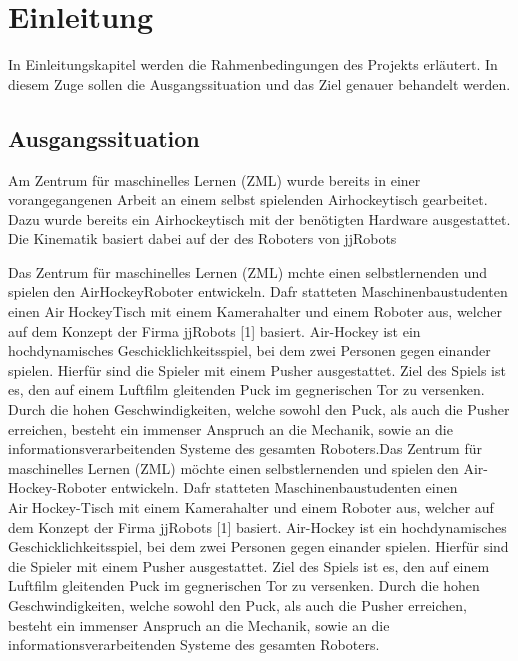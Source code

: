 \chapter{Einleitung}
\label{ch:Einleitung}

In Einleitungskapitel werden die Rahmenbedingungen des Projekts erläutert.
In diesem Zuge sollen die Ausgangssituation und das Ziel genauer behandelt werden.
\section{Ausgangssituation}
\label{sect:Ausgangssituation}

Am Zentrum für maschinelles Lernen (ZML) wurde bereits in einer vorangegangenen Arbeit an einem selbst spielenden Airhockeytisch gearbeitet. Dazu wurde bereits ein Airhockeytisch mit der benötigten Hardware ausgestattet. Die Kinematik basiert dabei auf der des Roboters von jjRobots \cite{jjrob}

Das Zentrum für maschinelles Lernen (ZML) mchte einen selbstlernenden und spielenden AirHockeyRoboter entwickeln. Dafr statteten Maschinenbaustudenten einen AirHockeyTisch mit einem Kamerahalter und einem Roboter aus, welcher auf dem Konzept
der Firma jjRobots [1] basiert.
Air-Hockey ist ein hochdynamisches Geschicklichkeitsspiel, bei dem zwei Personen gegeneinander spielen. Hierfür sind die Spieler mit einem Pusher ausgestattet. Ziel des Spiels
ist es, den auf einem Luftfilm gleitenden Puck im gegnerischen Tor zu versenken. Durch
die hohen Geschwindigkeiten, welche sowohl den Puck, als auch die Pusher erreichen, besteht ein immenser Anspruch an die Mechanik, sowie an die informationsverarbeitenden
Systeme des gesamten Roboters.Das Zentrum für maschinelles Lernen (ZML) möchte einen selbstlernenden und spielenden Air-Hockey-Roboter entwickeln. Dafr statteten Maschinenbaustudenten einen AirHockey-Tisch mit einem Kamerahalter und einem Roboter aus, welcher auf dem Konzept
der Firma jjRobots [1] basiert.
Air-Hockey ist ein hochdynamisches Geschicklichkeitsspiel, bei dem zwei Personen gegeneinander spielen. Hierfür sind die Spieler mit einem Pusher ausgestattet. Ziel des Spiels
ist es, den auf einem Luftfilm gleitenden Puck im gegnerischen Tor zu versenken. Durch
die hohen Geschwindigkeiten, welche sowohl den Puck, als auch die Pusher erreichen, besteht ein immenser Anspruch an die Mechanik, sowie an die informationsverarbeitenden
Systeme des gesamten Roboters.





\newpage